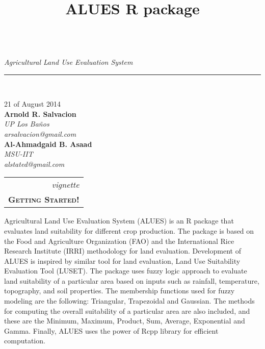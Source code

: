 \documentclass[11pt,fleqn]{article}\usepackage[]{graphicx}\usepackage[]{color}
\title{ALUES R package}
\newcommand{\ddate}{21 of August 2014}
\newcommand{\thepaper}{vignette}
\newcommand{\thesubject}{\textsc{Getting Started!}}
\begin{document}
\noindent
{\\
\textit{Agricultural Land Use Evaluation System}}\\[-0.3cm]
\rule{\linewidth}{0.3mm}\\[0.35cm]
\begin{minipage}[r]{0.5\textwidth}
\bigskip\tableofcontents
\end{minipage}
\begin{minipage}{0.5\textwidth}    
\begin{flushright}
\ddate\\[0.5cm]
\textbf{Arnold R. Salvacion}\\
\textit{UP Los Ba\~{n}os}\\
\textit{arsalvacion@gmail.com}\\[0.5cm]
\textbf{Al-Ahmadgaid B. Asaad}\\
\textit{MSU-IIT}\\
\textit{alstated@gmail.com}\\[0.5cm]
\begin{tabular}{r|}
\textit{\thepaper}\\
\textbf{\thesubject}
\end{tabular}
\end{flushright}
\end{minipage}
\thispagestyle{empty}

\bigskip\bigskip
Agricultural Land Use Evaluation System (ALUES) is an R package that evaluates land suitability for
different crop production. The package is based on the Food and Agriculture Organization (FAO) and the
International Rice Research Institute (IRRI) methodology for land evaluation. Development of ALUES is
inspired by similar tool for land evaluation, Land Use Suitability Evaluation Tool (LUSET). The package
uses fuzzy logic approach to evaluate land suitability of a particular area based on inputs such as rainfall,
temperature, topography, and soil properties. The membership functions used for fuzzy modeling are the
following: Triangular, Trapezoidal and Gaussian. The methods for computing the overall suitability of a particular area are also included, and these are the Minimum, Maximum, Product, Sum, Average, Exponential and Gamma. Finally, ALUES uses the power of Rcpp library for efficient computation.
\end{document}
